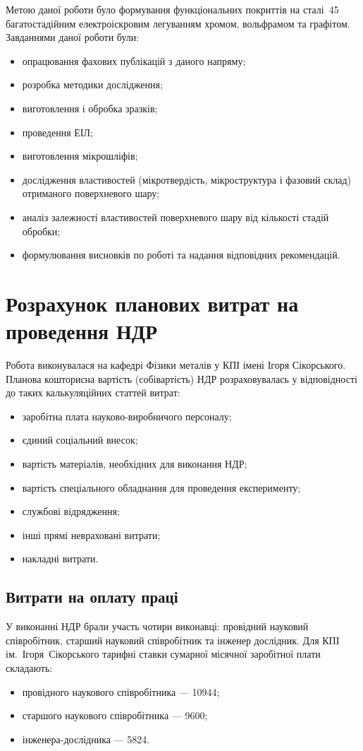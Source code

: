\documentclass[a4paper,fontsize=14bp,ukrainian]{extreport}
\begin{document}
Метою даної роботи було формування функціональних покриттів на сталі~45 багатостадійним електроіскровим легуванням хромом, вольфрамом та графітом. Завданнями даної роботи були:
\begin{itemize}
\item опрацювання фахових публікацій з даного напряму;
\item розробка методики дослідження;
\item виготовлення і обробка зразків;
\item проведення ЕІЛ;
\item виготовлення мікрошліфів;
\item дослідження властивостей (мікротвердість, мікроструктура і фазовий склад) отриманого поверхневого шару;
\item аналіз залежності властивостей поверхневого шару від кількості стадій обробки;
\item формулювання висновків по роботі та надання відповідних рекомендацій.
\end{itemize}

\section{Розрахунок планових витрат на проведення НДР}

Робота виконувалася на кафедрі Фізики металів у КПІ імені Ігоря Сікорського. Планова кошторисна вартість (собівартість) НДР розраховувалась у відповідності до таких калькуляційних статтей витрат:
\begin{itemize}
\item заробітна плата науково-виробничого персоналу;
\item єдиний соціальний внесок;
\item вартість матеріалів, необхідних для виконання НДР;
\item вартість спеціального обладнання для проведення експерименту;
\item службові відрядження;
\item інші прямі невраховані витрати;
\item накладні витрати.
\end{itemize}

\subsection{Витрати на оплату праці}
\label{subsec:salary}

У виконанні НДР брали участь чотири виконавці: провідний науковий співробітник, старший науковий співробітник та інженер дослідник. Для КПІ ім.~Ігоря~Сікорського тарифні ставки сумарної місячної заробітної плати складають:
\begin{itemize}
\item провідного наукового співробітника --- \SI{10944}{\grn};
\item старшого наукового співробітника --- \SI{9600}{\grn};
\item інженера-дослідника --- \SI{5824}{\grn}.
\end{itemize}
\end{document}

